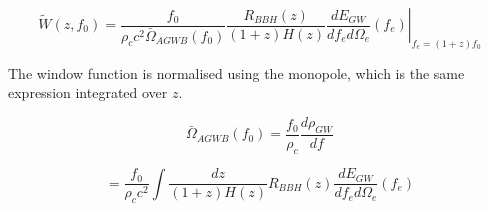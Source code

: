 \begin{equation}
\label{window}
    \tilde{W}(z, f_0)=\frac{f_0}{\rho_c c^2 \bar{\Omega}_{AGWB}(f_0)}
    \frac{R_{BBH}(z)}{(1+z)H(z)} \left. \frac{dE_{GW}}{df_e d\Omega_e}(f_e)\right|_{f_e=(1+z)f_0}
\end{equation}

The window function is normalised using the monopole, which is the same expression integrated over $z$.

\begin{equation}
    \bar{\Omega}_{AGWB}(f_0)= \frac{f_0}{\rho_c}\frac{d\rho_{GW}}{df}
\end{equation}

\begin{equation}
    = \frac{f_0}{\rho_c c^2 } \int \frac{dz}{(1+z)H(z)} R_{BBH}(z) \frac{dE_{GW}}{df_e d\Omega_e}(f_e)
\end{equation}

